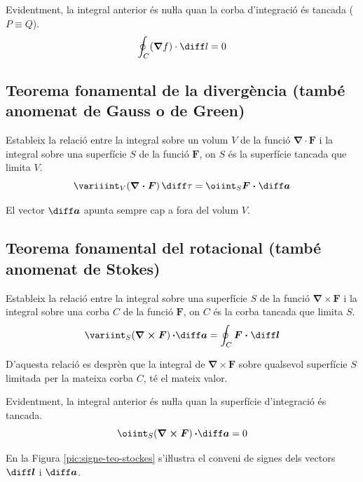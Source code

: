 \documentclass[catalan,a4paper,twoside,11pt]{article}
\begin{document}
Evidentment, la integral anterior és nuŀla quan la corba d'integració és tancada ($P \equiv Q$).
\begin{equation}
    \oint_C (\boldsymbol{\nabla}f) \cdot \diff l = 0
\end{equation}

\subsection{Teorema fonamental de la divergència (també anomenat de Gauss o de Green)}
Estableix la relació entre la integral sobre un volum $V$ de la funció $\boldsymbol{\nabla\cdot F}$ i la integral sobre una superfície $S$ de la funció $\boldsymbol{F}$, on $S$ és la superfície tancada que limita $V$.
\begin{equation}
    \variiint_V(\boldsymbol{\nabla\cdot F})\,\diff \tau = \oiint_S\boldsymbol{F\cdot\diff a}
\end{equation}

El vector $\boldsymbol{\diff a}$ apunta sempre cap a fora del volum $V$.

\subsection{Teorema fonamental del rotacional (també anomenat de Stokes)}
Estableix la relació entre la integral sobre una superfície $S$ de la funció $\boldsymbol{\nabla\times F}$ i la integral sobre una corba $C$ de la funció $\boldsymbol{F}$, on $C$ és la corba tancada que limita $S$.
\begin{equation}
    \variint_S(\boldsymbol{\nabla\times F})\boldsymbol{\,\cdot\diff a} =
    \oint_C\boldsymbol{F\cdot\diff l}
\end{equation}

D'aquesta relació es desprèn que la integral de $\boldsymbol{\nabla\times F}$ sobre qualsevol superfície $S$ limitada per la mateixa corba $C$, té el mateix valor.

Evidentment, la integral anterior és nuŀla quan la superfície d'integració és tancada.
\begin{equation}
    \oiint_S(\boldsymbol{\nabla\times F})\boldsymbol{\,\cdot\diff a} = 0
\end{equation}

En la Figura \vref{pic:signe-teo-stockes} s'iŀlustra el conveni de
signes dels vectors $\boldsymbol{\diff l}$ i $\boldsymbol{\diff a}$.
\end{document}
